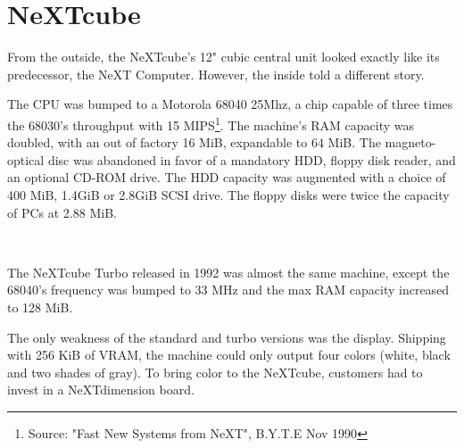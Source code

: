 
\section{NeXTcube}
From the outside, the NeXTcube's 12" cubic central unit looked exactly like its predecessor, the NeXT Computer. However, the inside told a different story.\\
\par
 The CPU was bumped to a Motorola 68040 25Mhz, a chip capable of three times the 68030's throughput with 15 MIPS\footnote{Source: "Fast New Systems from NeXT", B.Y.T.E Nov 1990}. The machine's RAM capacity was doubled, with an out of factory 16 MiB, expandable to 64 MiB. The magneto-optical disc was abandoned in favor of a mandatory HDD, floppy disk reader, and an optional CD-ROM drive. The HDD capacity was augmented with a choice of 400 MiB, 1.4GiB or 2.8GiB SCSI drive. The floppy disks were twice the capacity of PCs at 2.88 MiB.\\
\par
\begin{minipage}{\textwidth}
 \\
\end{minipage}

\par
The NeXTcube Turbo released in 1992 was almost the same machine, except the 68040's frequency was bumped to 33 MHz and the max RAM capacity increased to 128 MiB.\\
\par
The only weakness of the standard and turbo versions was the display. Shipping with 256 KiB of VRAM, the machine could only output four colors (white, black and two shades of gray). To bring color to the NeXTcube, customers had to invest in a NeXTdimension board.\\
\par

\pagebreak


